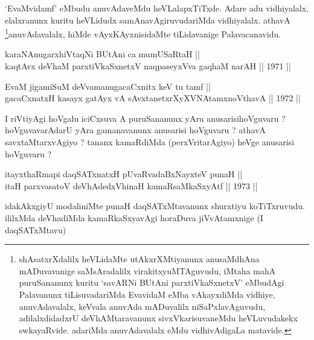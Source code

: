 \begin{artha}
`EvaMvidamf' eMbudu anuvAdaveMdu heVLalapxTiTxde. Adare
adu vidhiyalalx, elalxranunx kuritu heVLidudx samAnavAgiruvudariMda
vidhiyalalx. athavA \footnote{shAsatxrXdalilx heVLidaMte
utAkxrXMtiyanunx anusaMdhAna mADuvavanige saMsAradalilx
virakitxyuMTAguvudu, iMtaha mahA puruSananunx kuritu `savARNi BUtAni parxtiVkaSxnetxV'
eMbudAgi Palavanunx tiLisuvadariMda EvavidaM eMba vAkayxdiMda
vidhiye, anuvAdavalalx, keVvala anuvAda mADuvalilx
niSaPxlavAguvudu, adilalxdidadxrU deVhAMtaravanunx
sivxVkarisuvaneMdu heVLuvudakekx swkayaRvide. adariMda anuvAdavalalx
eMdu vidhivAdigaLa matavide.}anuvAdavalalx, hiMde
vAyxKAyxnisidaMte tiLidavanige Palavacanavidu.
\end{artha}


\begin{shl}
karaNAnugarxhiVtaqNi BUtAni ca mumUSaRtaH || \\
kaqtAvx deVhaM parxtiVkaSxnetxV naqpaseyxVva gaqhaM narAH \hfill || 1971 ||
  
\end{shl}



\begin{shl}
EvaM jigamiSuM deVvamanugacaCxnitx keV tu tamf || \\
gacaCxnatxH kasayx gatAyx vA sAvxtanetxrXyXVNA\s \s tamxnoV\s thavA \hfill || 1972 ||
  
\end{shl}

\begin{artha}
I riVtiyAgi hoVgalu iciCxsuva A puruSananunx yAru anusarisihoVguvaru ?
hoVguvavarAdarU yAra gamanavanunx anusarisi hoVguvaru ? athavA
savxtaMtarxvAgiyo ? tananx kamaRdiMda (perxVritarAgiyo) heVge
anusarisi hoVguvaru ?
\end{artha}

\begin{shl}
itayxthaRmapi daqSATxnatxH pUvaRvadaBxNayxteV punaH || \\
itaH parxvasatoV deVhAdedxVhinaH kamaRsaMkaSxyAtf \hfill || 1973 ||
  
\end{shl}

\begin{artha}
idakAkxgiyU modaliniMte punaH daqSATxMtavanunx shurxtiyu koTiTxruvudu. ililxMda deVhadiMda kamaRkaSxyavAgi horaDuva jiVvAtamxnige (I daqSATxMtavu)
\end{artha}

